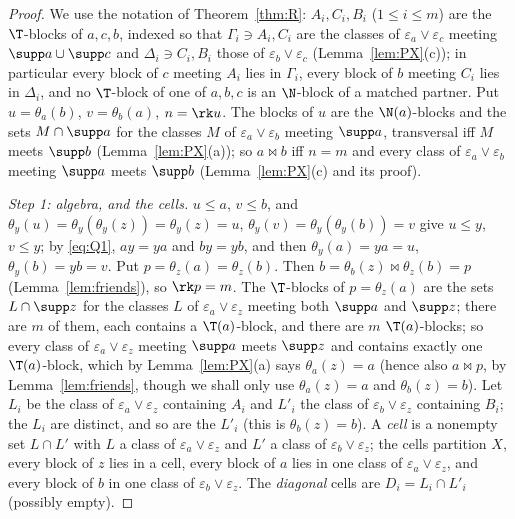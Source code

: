 \begin{proof}
We use the notation of Theorem~\ref{thm:R}: $A_i,C_i,B_i$ ($1\le i\le m$) are the $\T$-blocks of $a,c,b$, indexed so that $\Gamma_i\ni A_i,C_i$ are the classes of $\varepsilon_a\vee\varepsilon_c$ meeting $\supp a\cup\supp c$ and $\Delta_i\ni C_i,B_i$ those of $\varepsilon_b\vee\varepsilon_c$ (Lemma~\ref{lem:PX}(c)); in particular every block of $c$ meeting $A_i$ lies in $\Gamma_i$, every block of $b$ meeting $C_i$ lies in $\Delta_i$, and no $\T$-block of one of $a,b,c$ is an $\N$-block of a matched partner. Put $u=\theta_a(b)$, $v=\theta_b(a)$, $n=\rk u$. The blocks of $u$ are the $\N(a)$-blocks and the sets $M\cap\supp a$ for the classes $M$ of $\varepsilon_a\vee\varepsilon_b$ meeting $\supp a$, transversal iff $M$ meets $\supp b$ (Lemma~\ref{lem:PX}(a)); so $a\bowtie b$ iff $n=m$ and every class of $\varepsilon_a\vee\varepsilon_b$ meeting $\supp a$ meets $\supp b$ (Lemma~\ref{lem:PX}(c) and its proof).

\smallskip\emph{Step 1: algebra, and the cells.} $u\le a$, $v\le b$, and $\theta_y(u)=\theta_y(\theta_y(z))=\theta_y(z)=u$, $\theta_y(v)=\theta_y(\theta_y(b))=v$ give $u\le y$, $v\le y$; by \eqref{eq:Q1}, $ay=ya$ and $by=yb$, and then $\theta_y(a)=ya=u$, $\theta_y(b)=yb=v$. Put $p=\theta_z(a)=\theta_z(b)$. Then $b=\theta_b(z)\bowtie\theta_z(b)=p$ (Lemma~\ref{lem:friends}), so $\rk p=m$. The $\T$-blocks of $p=\theta_z(a)$ are the sets $L\cap\supp z$ for the classes $L$ of $\varepsilon_a\vee\varepsilon_z$ meeting both $\supp a$ and $\supp z$; there are $m$ of them, each contains a $\T(a)$-block, and there are $m$ $\T(a)$-blocks; so every class of $\varepsilon_a\vee\varepsilon_z$ meeting $\supp a$ meets $\supp z$ and contains exactly one $\T(a)$-block, which by Lemma~\ref{lem:PX}(a) says $\theta_a(z)=a$ (hence also $a\bowtie p$, by Lemma~\ref{lem:friends}, though we shall only use $\theta_a(z)=a$ and $\theta_b(z)=b$). Let $L_i$ be the class of $\varepsilon_a\vee\varepsilon_z$ containing $A_i$ and $L'_i$ the class of $\varepsilon_b\vee\varepsilon_z$ containing $B_i$; the $L_i$ are distinct, and so are the $L'_i$ (this is $\theta_b(z)=b$). A \emph{cell} is a nonempty set $L\cap L'$ with $L$ a class of $\varepsilon_a\vee\varepsilon_z$ and $L'$ a class of $\varepsilon_b\vee\varepsilon_z$; the cells partition $X$, every block of $z$ lies in a cell, every block of $a$ lies in one class of $\varepsilon_a\vee\varepsilon_z$, and every block of $b$ in one class of $\varepsilon_b\vee\varepsilon_z$. The \emph{diagonal} cells are $D_i=L_i\cap L'_i$ (possibly empty).


\end{proof}
